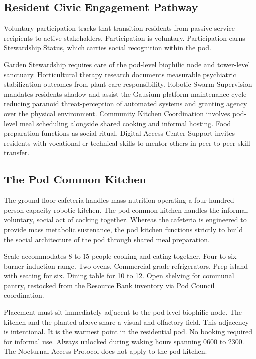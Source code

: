 \documentclass[12pt, letterpaper]{article}
\begin{document}
\subsection{Resident Civic Engagement Pathway}

Voluntary participation tracks that transition residents from passive service recipients to active stakeholders. Participation is voluntary. Participation earns Stewardship Status, which carries social recognition within the pod.

Garden Stewardship requires care of the pod-level biophilic node and tower-level sanctuary. Horticultural therapy research documents measurable psychiatric stabilization outcomes from plant care responsibility. Robotic Swarm Supervision mandates residents shadow and assist the Gausium platform maintenance cycle reducing paranoid threat-perception of automated systems and granting agency over the physical environment. Community Kitchen Coordination involves pod-level meal scheduling alongside shared cooking and informal hosting. Food preparation functions as social ritual. Digital Access Center Support invites residents with vocational or technical skills to mentor others in peer-to-peer skill transfer.

\subsection{The Pod Common Kitchen}

The ground floor cafeteria handles mass nutrition operating a four-hundred-person capacity robotic kitchen. The pod common kitchen handles the informal, voluntary, social act of cooking together. Whereas the cafeteria is engineered to provide mass metabolic sustenance, the pod kitchen functions strictly to build the social architecture of the pod through shared meal preparation.

Scale accommodates 8 to 15 people cooking and eating together. Four-to-six-burner induction range. Two ovens. Commercial-grade refrigerators. Prep island with seating for six. Dining table for 10 to 12. Open shelving for communal pantry, restocked from the Resource Bank inventory via Pod Council coordination.

Placement must sit immediately adjacent to the pod-level biophilic node. The kitchen and the planted alcove share a visual and olfactory field. This adjacency is intentional. It is the warmest point in the residential pod. No booking required for informal use. Always unlocked during waking hours spanning 0600 to 2300. The Nocturnal Access Protocol does not apply to the pod kitchen.
\end{document}
